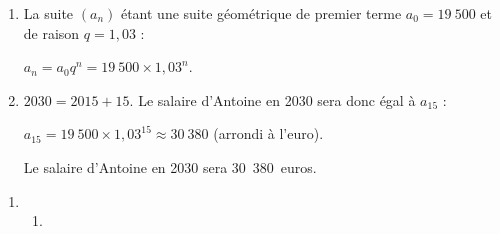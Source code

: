 \begin{corrige}
\begin{enumerate}
          \begin{enumerate}[label=\alph*.]

               \item %
               La suite $(a_n)$ étant une suite géométrique de premier terme $a_0=19\ 500$ et de raison $q=1,03$ :
               \par
               $a_n = a_0q^n=19\ 500 \times 1,03^n$.
               \item %
               ${2030=2015+15}$. Le salaire d'Antoine en 2030 sera donc égal à $a_{15}$ :
               \par
               $a_{15}=19\ 500 \times 1,03^{15}\approx 30\ 380$ (arrondi à l'euro).
               \par
               Le salaire d'Antoine en 2030 sera 30~380~euros.
               \par
          \end{enumerate}
          \par
     \end{enumerate}
     \par
     \par
     \begin{enumerate}
          \item %
          \begin{enumerate}[label=\alph*.]
               \item %


\end{enumerate}
\end{enumerate}
\end{corrige}
